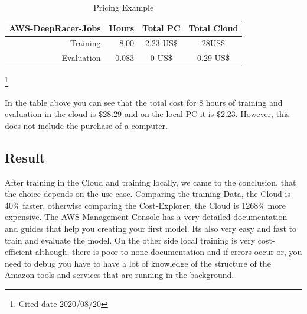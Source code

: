 \begin{table}[H]
\caption{Pricing Example}
\label{tab:services}
\centering
\setlength{\tabcolsep}{5mm}
\def\arraystretch{1.25}
\begin{tabular}{|r|r|c|c|}
\hline
\textbf{AWS-DeepRacer-Jobs} & \textbf{Hours} & \textbf{Total PC} & \textbf{Total Cloud} \\
\hline\hline
Training & 8,00 & 2.23 US\$ & 28US\$ \\
\hline
Evaluation & 0.083 & 0 US\$ & 0.29 US\$ \\
\hline
\end{tabular}
\end{table}
\footnote{Cited date 2020/08/20}

In the table above you can see that the total cost for 8 hours of training and evaluation in the cloud is \$28.29 and on the local PC it is \$2.23. However, this does not include the purchase of a computer.

\subsection{Result}
After training in the Cloud and training locally, we came to the conclusion, that the choice depends on the use-case. Comparing the training Data, the Cloud is 40\% faster, otherwise comparing the Cost-Explorer, the Cloud is 1268\% more expensive. The AWS-Management Console has a very detailed documentation and guides that help you creating your first model. Its also very easy and fast to train and evaluate the model. On the other side local training is very cost-efficient although, there is poor to none documentation and if errors occur or, you need to debug you have to have a lot of knowledge of the structure of the Amazon tools and services that are running in the background. 

